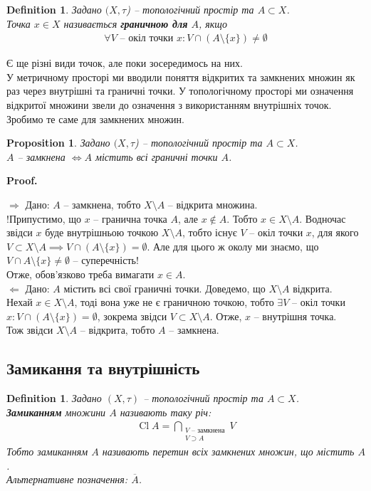\documentclass[a4paper, 10pt]{article}
\makeatletter
\def\rightproof{$\boxed{\Rightarrow}$ }
\def\leftproof{$\boxed{\Leftarrow}$ }
\theoremstyle{theoremdd}
\newtheorem{definition}[theorem]{Definition}
\newtheorem{proposition}[theorem]{Proposition}
\DeclareMathOperator{\Cl}{Cl}
\renewenvironment{proof}[1][Proof.\\]{\par
\pushQED{\hfill \qed}%
\normalfont \topsep6\p@\@plus6\p@\relax
\trivlist
\item\relax
{\bfseries
#1\@addpunct{.}}\hspace\labelsep\ignorespaces
}{%
\popQED\endtrivlist\@endpefalse
}
\makeatother
\begin{document}
\begin{definition}
Задано $(X,\tau$) -- топологічний простір та $A \subset X$.\\
Точка $x \in X$ називається \textbf{граничною для} $A$, якщо
\begin{align*}
\forall V \text{ -- окіл точки } x: V \cap (A \setminus \{x\}) \neq \emptyset
\end{align*}
\end{definition}
\noindent Є ще різні види точок, але поки зосередимось на них.\\
У метричному просторі ми вводили поняття відкритих та замкнених множин як раз через внутрішні та граничні точки. У топологічному просторі ми означення відкритої множини звели до означення з використанням внутрішніх точок. Зробимо те саме для замкнених множин.

\begin{proposition}
Задано $(X,\tau$) -- топологічний простір та $A \subset X$.\\
$A$ -- замкнена $\iff A$ містить всі граничні точки $A$.
\end{proposition}

\begin{proof}
\rightproof Дано: $A$ -- замкнена, тобто $X \setminus A$ -- відкрита множина.\\
!Припустимо, що $x$ -- гранична точка $A$, але $x \notin A$. Тобто $x \in X \setminus A$. Водночас звідси $x$ буде внутрішньою точкою $X \setminus A$, тобто існує $V$ -- окіл точки $x$, для якого $V \subset X \setminus A \implies V \cap (A \setminus \{x\}) = \emptyset$. Але для цього ж околу ми знаємо, що $V \cap A \setminus \{x\} \neq \emptyset$ -- суперечність!\\
Отже, обов'язково треба вимагати $x \in A$.
\bigskip \\
\leftproof Дано: $A$ містить всі свої граничні точки. Доведемо, що $X \setminus A$ відкрита.\\
Нехай $x \in X \setminus A$, тоді вона уже не є граничною точкою, тобто $\exists V$ -- окіл точки $x: V \cap (A \setminus \{x\}) = \emptyset$, зокрема звідси $V \subset X \setminus A$. Отже, $x$ -- внутрішня точка.\\
Тож звідси $X \setminus A$ -- відкрита, тобто $A$ -- замкнена.
\end{proof}

\subsection{Замикання та внутрішність}
\begin{definition}
Задано $(X,\tau)$ -- топологічний простір та $A \subset X$.\\
\textbf{Замиканням} множини $A$ називають таку річ:
\begin{align*}
\Cl A = \bigcap_{\substack{\text{$V$ -- замкнена} \\ V \supset A}} V
\end{align*}
Тобто замиканням $A$ називають перетин всіх замкнених множин, що містить $A$.\\
Альтернативне позначення: $\overline{A}$.
\end{definition}
\end{document}
